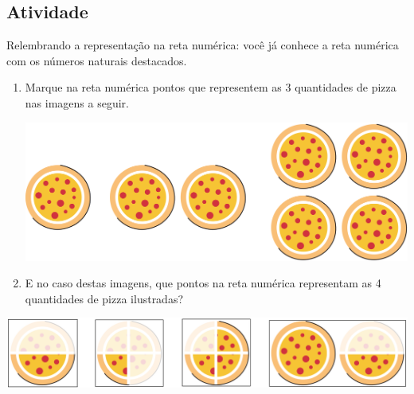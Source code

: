   
\subsection{Atividade}

Relembrando a representação na reta numérica: você já conhece a reta numérica com os números naturais destacados.


\begin{enumerate} [\quad a)] %
  \item     Marque na reta numérica pontos que representem as 3 quantidades de pizza nas imagens a seguir. 

\begin{center}
\includegraphics[width=400pt, keepaspectratio]{..//media/cap3/secoes/png/ativ2_fig_a.png} 
\end{center}

\begin{center}
\end{center}

\item     E no caso destas imagens, que pontos na reta numérica representam as 4 quantidades de pizza ilustradas?
\end{enumerate} %

\begin{center}
\includegraphics[width=400pt, keepaspectratio]{..//media/cap3/secoes/png/ativ2_fig_b2.png} 
\end{center}


